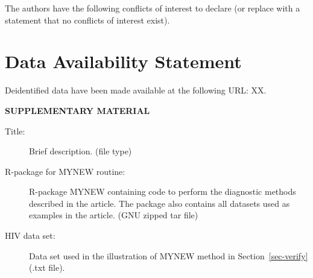 \documentclass[
  12pt]{article}
\begin{document}
The authors have the following conflicts of interest to declare (or
replace with a statement that no conflicts of interest exist).

\section{Data Availability Statement}\label{data-availability-statement}

Deidentified data have been made available at the following URL: XX.

\label{supplementary-material}
\bigskip

\begin{center}

{\large\bf SUPPLEMENTARY MATERIAL}

\end{center}

\begin{description}
\item[Title:]
Brief description. (file type)
\item[R-package for MYNEW routine:]
R-package MYNEW containing code to perform the diagnostic methods
described in the article. The package also contains all datasets used as
examples in the article. (GNU zipped tar file)
\item[HIV data set:]
Data set used in the illustration of MYNEW method in
Section~\ref{sec-verify} (.txt file).
\end{description}


  
\end{document}
